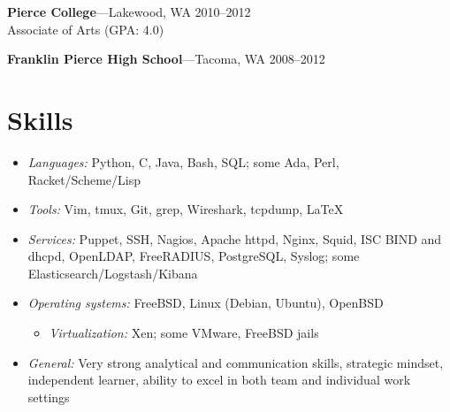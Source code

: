 \documentclass[11pt, letterpaper]{article}
\begin{document}
\textbf{Pierce College}---Lakewood, WA \hfill 2010--2012\\
Associate of Arts (GPA: 4.0)
\setlength{\parskip}{\baselineskip}

\textbf{Franklin Pierce High School}---Tacoma, WA \hfill 2008--2012\\
\setlength{\parskip}{-9pt}

\section*{Skills}
\setlength{\parskip}{11pt}

\raggedright
\begin{itemize}
    \item \textit{Languages:} Python, C, Java, Bash, SQL; some Ada, Perl, Racket/Scheme/Lisp
    \item \textit{Tools:} Vim, tmux, Git, grep, Wireshark, tcpdump, \LaTeX
    \item \textit{Services:} Puppet, SSH, Nagios, Apache httpd, Nginx, Squid, ISC BIND and dhcpd, OpenLDAP, FreeRADIUS, PostgreSQL, Syslog; some Elasticsearch/Logstash/Kibana
    \item \textit{Operating systems:} FreeBSD, Linux (Debian, Ubuntu), OpenBSD \begin{itemize}
        \item \textit{Virtualization:} Xen; some VMware, FreeBSD jails
    \end{itemize}
    \item \textit{General:} Very strong analytical and communication skills, strategic mindset, independent learner, ability to excel in both team and individual work settings
\end{itemize}
\end{document}
